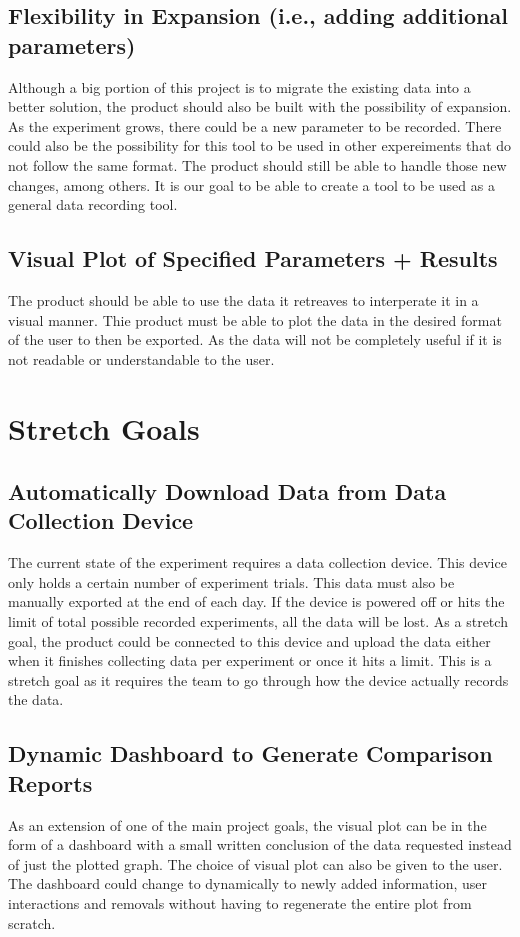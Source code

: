 \documentclass{article}
\begin{document}
\subsection*{Flexibility in Expansion (i.e., adding additional parameters)}
Although a big portion of this project is to migrate the existing data into a better solution, the product should also be 
built with the possibility of expansion. As the experiment grows, there could be a new parameter to be recorded. 
There could also be the possibility for this tool to be used in other expereiments that do not follow the same format. The product should still be able to handle those new changes, among others. 
It is our goal to be able to create a tool to be used as a general data recording tool. 

\subsection*{Visual Plot of Specified Parameters + Results}
The product should be able to use the data it retreaves to interperate it in a visual manner. 
Thie product must be able to plot the data in the desired format of the user to then be exported. 
As the data will not be completely useful if it is not readable or understandable to the user. 

\section{Stretch Goals}
\subsection*{Automatically Download Data from Data Collection Device}
The current state of the experiment requires a data collection device. This device only holds a certain number of experiment trials.
This data must also be manually exported at the end of each day. If the device is powered off or hits the limit of total possible recorded experiments, all the data will be lost.
As a stretch goal, the product could be connected to this device and upload the data either when it finishes collecting data per experiment or once it hits a limit.
This is a stretch goal as it requires the team to go through how the device actually records the data.


\subsection*{Dynamic Dashboard to Generate Comparison Reports}
As an extension of one of the main project goals, the visual plot can be in the form of a dashboard with a small written conclusion of the data requested instead of just the plotted graph.
The choice of visual plot can also be given to the user. The dashboard could change to dynamically to newly added information, user interactions and removals
without having to regenerate the entire plot from scratch.  
\end{document}

